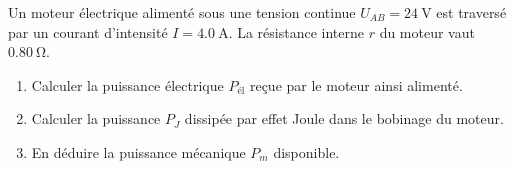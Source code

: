 Un moteur électrique alimenté sous une tension continue $U_{AB}=\qty{24}{\V}$
est traversé par un courant d'intensité $I=\qty{4.0}{\A}$. La résistance interne
$r$ du moteur vaut $\qty{0.80}{\ohm}$.
\begin{enumerate}
    \item Calculer la puissance électrique $P_{\text{él}}$ reçue par le moteur
          ainsi alimenté.
    \item Calculer la puissance $P_{J}$ dissipée par effet Joule dans le
          bobinage du moteur.
    \item En déduire la puissance mécanique $P_{m}$ disponible.
\end{enumerate}

